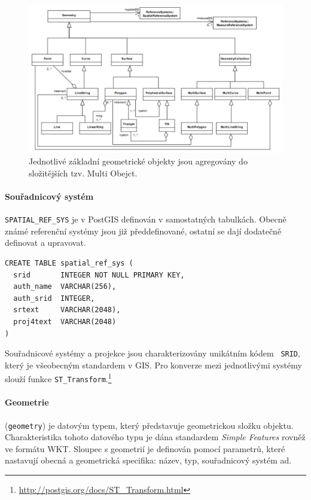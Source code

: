 \documentclass[a4paper,12pt,oneside]{report}
\begin{document}
\begin{figure}[h!]
    \centering
    \includegraphics[width=1\textwidth]{./img/implementace/ogc1.jpg}
    \caption[Model PostGIS]{\centering Jednotlivé základní geometrické objekty 
    jsou agregovány do složitějších tzv. Multi Obejct.     \footnotemark}
 \end{figure}   

\paragraph*{Souřadnicový systém} \texttt{SPATIAL\_REF\_SYS} je v
PostGIS definován v samostatných tabulkách. Obecně známé referenční
systémy jsou již předdefinované, ostatní se dají dodatečně definovat a
upravovat.

\begin{verbatim}
CREATE TABLE spatial_ref_sys (
  srid       INTEGER NOT NULL PRIMARY KEY,
  auth_name  VARCHAR(256),
  auth_srid  INTEGER,
  srtext     VARCHAR(2048),
  proj4text  VARCHAR(2048)
)
\end{verbatim}

Souřadnicové systémy a projekce jsou charakterizovány unikátním kódem
\texttt{   \acs{SRID}}, který je všeobecným standardem v GIS. Pro
konverze mezi jednotlivými systémy slouží funkce
\texttt{ST\_Transform}.\footnote{\url{http://postgis.org/docs/ST_Transform.html}}


\paragraph*{Geometrie} (\texttt{geometry}) je datovým typem, který
představuje geometrickou složku objektu.  Charakteristika tohoto
datového typu je dána standardem \textit{Simple Features} rovněž ve formátu
   \acs{WKT}.  Sloupec s geometrií je definován pomocí parametrů, které
nastavují obecná a geometrická specifika: název, typ, souřadnicový
systém ad.
\end{document}
